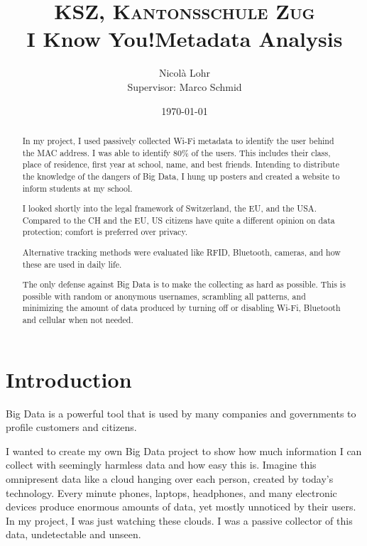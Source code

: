 \documentclass[paper=a4, fontsize=11pt]{article}
\title{\normalfont \normalsize \textsc{KSZ, Kantonsschule Zug} \\ [25pt]
\huge I Know You!\linebreak\linebreak \large Metadata Analysis\\
}
\author{Nicolà Lohr\\[0.5cm]{\small Supervisor: Marco Schmid}}
\date{\normalsize\today}
\begin{document}
\clearpage
\thispagestyle{empty}
\newpage
\linespread{1}
\tableofcontents
\linespread{1.5}
\newpage
\begin{abstract}
In my project, I used passively collected Wi-Fi metadata to identify the user behind the MAC address. I was able to identify 80\% of the users. This includes their class, place of residence, first year at school, name, and best friends.
Intending to distribute the knowledge of the dangers of Big Data, I hung up posters and created a website to inform students at my school.

I looked shortly into the legal framework of Switzerland, the EU, and the USA. Compared to the CH and the EU, US citizens have quite a different opinion on data protection; comfort is preferred over privacy.

Alternative tracking methods were evaluated like RFID, Bluetooth, cameras, and how these are used in daily life.

The only defense against Big Data is to make the collecting as hard as possible. This is possible with random or anonymous usernames, scrambling all patterns, and minimizing the amount of data produced by turning off or disabling Wi-Fi, Bluetooth and cellular when not needed.
\end{abstract}

\section{Introduction}
Big Data is a powerful tool that is used by many companies and governments to profile customers and citizens.

I wanted to create my own Big Data project to show how much information I can collect with seemingly harmless data and how easy this is. Imagine this omnipresent data like a cloud hanging over each person, created by today's technology. Every minute phones, laptops, headphones, and many electronic devices produce enormous amounts of data, yet mostly unnoticed by their users. In my project, I was just watching these clouds. I was a passive collector of this data, undetectable and unseen.
\end{document}
